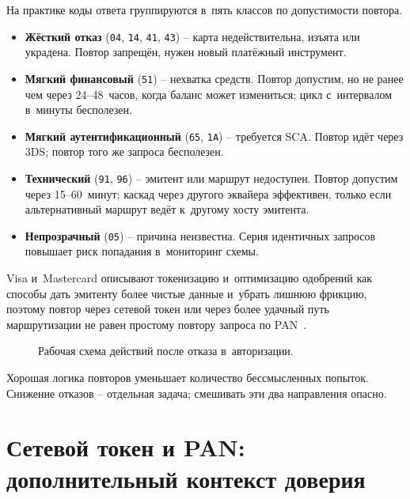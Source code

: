 На практике коды ответа группируются в~пять классов
по допустимости повтора.

\begin{itemize}
  \item \textbf{Жёсткий отказ} (\texttt{04}, \texttt{14},
    \texttt{41}, \texttt{43}) -- карта недействительна, изъята
    или украдена. Повтор запрещён, нужен новый платёжный
    инструмент.
  \item \textbf{Мягкий финансовый} (\texttt{51}) -- нехватка
    средств. Повтор допустим, но не ранее чем через 24--48~часов,
    когда баланс может измениться; цикл с~интервалом в~минуты
    бесполезен.
  \item \textbf{Мягкий аутентификационный} (\texttt{65},
    \texttt{1A}) -- требуется SCA. Повтор идёт через 3DS;
    повтор того же запроса бесполезен.
  \item \textbf{Технический} (\texttt{91}, \texttt{96}) --
    эмитент или маршрут недоступен. Повтор допустим через
    15--60~минут; каскад через другого эквайера эффективен,
    только если альтернативный маршрут ведёт к~другому хосту
    эмитента.
  \item \textbf{Непрозрачный} (\texttt{05}) -- причина неизвестна.
    Серия идентичных запросов повышает риск попадания
    в~мониторинг схемы.
\end{itemize}

Visa и~Mastercard описывают токенизацию и~оптимизацию одобрений
как способы дать эмитенту более чистые данные и~убрать лишнюю
фрикцию, поэтому повтор через
сетевой токен или через более удачный путь маршрутизации
не равен простому повтору
запроса по PAN~\cite{visa-vts,visa-tokenization-security,mc-acquirers-psps,mc-pop}.

\begin{figure}[tbp]
  \centering
  \caption{Рабочая схема действий после отказа в~авторизации.}\label{fig:decline-retry-tree}
\end{figure}

Хорошая логика повторов уменьшает количество бессмысленных попыток.
Снижение отказов -- отдельная задача; смешивать эти два направления
опасно.

\section{Сетевой токен и PAN: дополнительный контекст доверия}\label{sec:decline-tokens}

